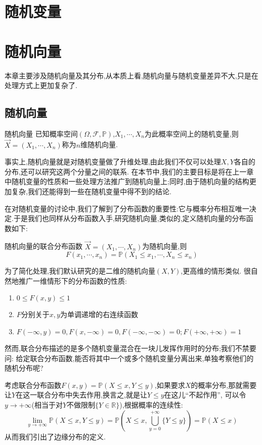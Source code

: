 \documentclass[lang=cn,10pt]{elegantbook}
\begin{document}
\chapter{随机变量}
\chapter{随机向量}
本章主要涉及随机向量及其分布,从本质上看,随机向量与随机变量差异不大,只是在处理方式上更加复杂了.
\section{随机向量}
\begin{definition}{随机向量}{}
    已知概率空间$(\Omega,\mathcal{F},\mathbb{P})$,$X_1,\cdots,X_n$为此概率空间上的随机变量,则$\overrightarrow{X}=(X_1,\cdots,X_n)$称为$n$维随机向量.
\end{definition}
事实上,随机向量就是对随机变量做了升维处理,由此我们不仅可以处理$X,Y$各自的分布,还可以研究这两个分量之间的联系.
在本节中,我们的主要目标是将在上一章中随机变量的性质和一些处理方法推广到随机向量上;同时,由于随机向量的结构更加复杂,我们还能得到一些在随机变量中得不到的结论.

在对随机变量的讨论中,我们了解到了分布函数的重要性:它与概率分布相互唯一决定.于是我们也同样从分布函数入手,研究随机向量,类似的,定义随机向量的分布函数如下:
\begin{definition}{随机向量的联合分布函数}{}
    $\overrightarrow{X}=(X_1,\cdots,X_n)$为随机向量,则
    $$F(x_1,\cdots,x_n)=\mathbb{P}(X_1\leq x_1,\cdots,X_n\leq x_n)$$
\end{definition}
为了简化处理,我们默认研究的是二维的随机向量$(X,Y)$,更高维的情形类似. 很自然地推广一维情形下的分布函数的性质: 
\begin{enumerate}
    \item $0\leq F(x,y)\leq 1$
    \item $F$分别关于$x,y$为单调递增的右连续函数
    \item $F(-\infty,y)=0,F(x,-\infty)=0,F(-\infty,-\infty)=0;F(+\infty,+\infty)=1$
\end{enumerate}

然而,联合分布描述的是多个随机变量混合在一块儿发挥作用时的分布;我们不禁要问: 给定联合分布函数,能否将其中一个或多个随机变量分离出来,单独考察他们的随机分布呢?

考虑联合分布函数$F(x,y)=\mathbb{P}(X\leq x,Y\leq y)$,如果要求$X$的概率分布,那就需要让$Y$在这一联合分布中失去作用,换言之,就是让$Y\leq y$在这儿“不起作用”,
可以令$y\to +\infty$(相当于对$Y$不做限制$\{Y\in \mathbb{R}\}$),根据概率的连续性:
$$\lim_{y\to +\infty}\mathbb{P}(X\leq x,Y\leq y)=\mathbb{P}(X\leq x,\bigcup_{y=0}^{+\infty}\{Y\leq y\})=\mathbb{P}(X\leq x)$$
从而我们引出了边缘分布的定义.
\end{document}

